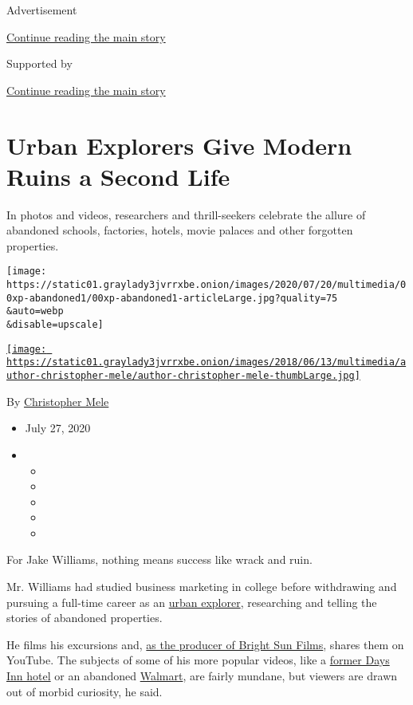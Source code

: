 Advertisement

\protect\hyperlink{after-top}{Continue reading the main story}

Supported by

\protect\hyperlink{after-sponsor}{Continue reading the main story}

\hypertarget{urban-explorers-give-modern-ruins-a-second-life}{%
\section{Urban Explorers Give Modern Ruins a Second
Life}\label{urban-explorers-give-modern-ruins-a-second-life}}

In photos and videos, researchers and thrill-seekers celebrate the
allure of abandoned schools, factories, hotels, movie palaces and other
forgotten properties.

\texttt{[image: https://static01.graylady3jvrrxbe.onion/images/2020/07/20/multimedia/00xp-abandoned1/00xp-abandoned1-articleLarge.jpg?quality=75\\\&auto=webp\\\&disable=upscale]}

\href{https://www.nytimes3xbfgragh.onion/by/christopher-mele}{\texttt{[image: https://static01.graylady3jvrrxbe.onion/images/2018/06/13/multimedia/author-christopher-mele/author-christopher-mele-thumbLarge.jpg]}}

By
\href{https://www.nytimes3xbfgragh.onion/by/christopher-mele}{Christopher
Mele}

\begin{itemize}
\item
  July 27, 2020
\item
  \begin{itemize}
  \item
  \item
  \item
  \item
  \item
  \end{itemize}
\end{itemize}

For Jake Williams, nothing means success like wrack and ruin.

Mr. Williams had studied business marketing in college before
withdrawing and pursuing a full-time career as an
\href{http://www.forbidden-places.net/why.php}{urban explorer},
researching and telling the stories of abandoned properties.

He films his excursions and,
\href{https://www.youtube.com/channel/UC5k3Kc0avyDJ2nG9Kxm9JmQ}{as the
producer of Bright Sun Films}, shares them on YouTube. The subjects of
some of his more popular videos, like a
\href{https://www.youtube.com/watch?v=3gJfEOx_NGA}{former Days Inn
hotel} or an abandoned
\href{https://www.youtube.com/watch?v=Mr1CWRc174o}{Walmart}, are fairly
mundane, but viewers are drawn out of morbid curiosity, he said.

